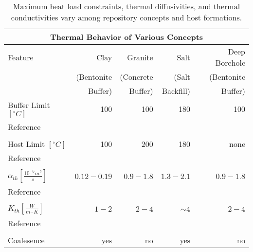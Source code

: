 %
\begin{table}[h!]
  \centering
  \footnotesize{
  \begin{tabular}{|l|r|r|r|r|}
    \multicolumn{5}{c}{\textbf{Thermal Behavior of Various Concepts}}\\
    \hline
    Feature & Clay & Granite & Salt & Deep Borehole \\ 
            & (Bentonite & (Concrete & (Salt & (Bentonite\\ 
            & Buffer) & Buffer) & Backfill) & Buffer) \\ 
    \hline
    Buffer Limit $[^{\circ}C]$ & 100  & 100  & 180 & 100  \\ 
    Reference
    & \cite{hardin_generic_2011}   
    & \cite{von_lensa_red-impact_2008}   
    & \cite{von_lensa_red-impact_2008,brewitz_long-term_2002,carter_thermal_2011}   
    & \cite{von_lensa_red-impact_2008}  \\ 
    &      &      &     &      \\
    Host Limit $[^{\circ}C]$   & 100  & 200  & 180 & none \\ 
    Reference                     
    & \cite{<++>}   
    & \cite{<++>}   
    & \cite{<++>}   
    & \cite{<++>}   \\
    &      &      &     &      \\
    $\alpha_{th} [\frac{10^{-6}m^2}{s}]$ & $0.12-0.19$ & $0.9-1.8$ & $1.3-2.1$ & $0.9-1.8$ \\ 
    Reference                     
    & \cite{tikhonravova_effect_2007} 
    & \cite{durham_thermal_1987,hardin_generic_2011,kim_thermal_2007}     
    & \cite{hardin_generic_2011,nieland_storage_2001}   
    & \cite{durham_thermal_1987,hardin_generic_2011,kim_thermal_2007}   \\ 
    &      &      &     &      \\
    $K_{th} [\frac{W}{m{\cdot}K}]$ & $1-2$ & $2-4$ & $\sim4$  & $2-4$ \\ 
    Reference                     
    & \cite{hardin_generic_2011,tikhonravova_effect_2007}    
    & \cite{hardin_generic_2011,kim_thermal_2007,surma_porosity_2003,ab_long-term_2006}    
    & \cite{hardin_generic_2011,nieland_storage_2001}
    & \cite{hardin_generic_2011,kim_thermal_2007,surma_porosity_2003}\\ 
    &      &      &     &      \\
    Coalesence & yes & no & yes & no \\ 
    \hline
  \end{tabular}
  \caption[Models for Heat Transport for Various Geologies]{Maximum heat load constraints, thermal 
  diffusivities, and thermal conductivities vary among repository concepts and host formations. }
  }
  \label{tab:heat_tab}
\end{table}
